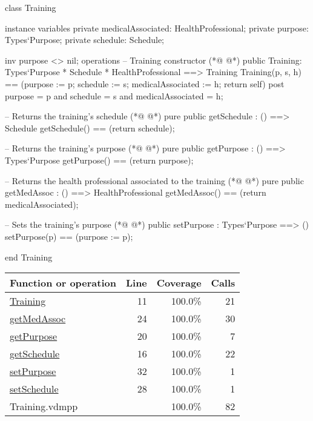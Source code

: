 \begin{vdmpp}[breaklines=true]
class Training
 
instance variables
 private medicalAssociated: HealthProfessional;
 private purpose: Types`Purpose;
 private schedule: Schedule;

 inv purpose <> nil;
operations
 -- Training constructor
(*@
\label{Training:11}
@*)
 public Training: Types`Purpose * Schedule * HealthProfessional ==> Training
   Training(p, s, h) == (purpose := p; schedule := s; medicalAssociated := h; return self)
 post purpose = p and schedule = s and medicalAssociated = h;
 
 -- Returns the training's schedule
(*@
\label{getSchedule:16}
@*)
 pure public getSchedule : () ==> Schedule
   getSchedule() == (return schedule);
 
 -- Returns the training's purpose
(*@
\label{getPurpose:20}
@*)
  pure public getPurpose : () ==> Types`Purpose
  getPurpose() == (return purpose); 
 
 -- Returns the health professional associated to the training
(*@
\label{getMedAssoc:24}
@*)
 pure public getMedAssoc : () ==> HealthProfessional
  getMedAssoc() == (return medicalAssociated); 
 
 -- Sets the training's purpose
(*@
\label{setSchedule:28}
@*)
 public setPurpose : Types`Purpose ==> ()
   setPurpose(p) == (purpose := p);
 
 end Training
\end{vdmpp}
\bigskip
\begin{longtable}{|l|r|r|r|}
\hline
Function or operation & Line & Coverage & Calls \\
\hline
\hline
\hyperref[Training:11]{Training} & 11&100.0\% & 21 \\
\hline
\hyperref[getMedAssoc:24]{getMedAssoc} & 24&100.0\% & 30 \\
\hline
\hyperref[getPurpose:20]{getPurpose} & 20&100.0\% & 7 \\
\hline
\hyperref[getSchedule:16]{getSchedule} & 16&100.0\% & 22 \\
\hline
\hyperref[setPurpose:32]{setPurpose} & 32&100.0\% & 1 \\
\hline
\hyperref[setSchedule:28]{setSchedule} & 28&100.0\% & 1 \\
\hline
\hline
Training.vdmpp & & 100.0\% & 82 \\
\hline
\end{longtable}

